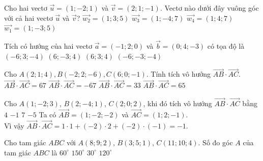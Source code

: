 \begin{ex}
	Cho hai vectơ $\vec{u}=(1;-2;1)$ và $\vec{v}=(2;1;-1)$. Vectơ nào dưới đây vuông góc với cả hai vectơ $\vec{u}$ và $\vec{v}$?
	\choice
	{\True $\vec{w_2}=(1;3;5)$}
	{$\vec{w_3}=(1;-4;7)$}
	{$\vec{w_4}=(1;4;7)$}
	{$\vec{w_1}=(1;-3;5)$}
\end{ex} 

\begin{ex}
	Tích có hướng của hai vectơ $\vec{a}=(-1;2;0)$ và $\vec{b}=(0;4;-3)$ có tọa độ là
	\choice
	{$(-6;3;-4)$}
	{$(6;-3;4)$}
	{$(6;3;4)$}
	{\True $(-6;-3;-4)$}
\end{ex} 

\begin{ex}
	Cho $ A(2;1;4), B(-2;2;-6), C(6;0;-1) $. Tính tích vô hướng $ \vec{AB}\cdot \vec{AC} $.
	\choice
	{$\vec{AB}\cdot \vec{AC}=67$}
	{$\vec{AB}\cdot \vec{AC}=-67$}
	{\True$\vec{AB}\cdot \vec{AC}=33$}
	{$\vec{AB}\cdot \vec{AC}=65$}
\end{ex} 

\begin{ex}
	Cho $ A(1;-2; 3)$, $ B(2;-4; 1)$, $ C(2; 0; 2)$, khi đó tích vô hướng $\vec{AB}\cdot\vec{AC}$ bằng
	\choice
	{$4$}
	{\True $-1$}
	{$7$}
	{$-5$}
	\loigiai
	{
		Ta có $\vec{AB}=(1;-2;-2)$ và $\vec{AC}=(1; 2;-1)$.\\
		Vì vậy $\vec{AB}\cdot\vec{AC}=1\cdot 1+(-2)\cdot 2+(-2)\cdot (-1)=-1 $.
	}
\end{ex} 

\begin{ex}%
	Cho tam giác $ABC$ với $A(8; 9; 2)$, $B(3; 5; 1)$, $C(11; 10; 4)$. Số đo góc $A$ của tam giác $ABC$ là
	\choice
	{$60^\circ$}
	{\True $150^\circ$}
	{$30^\circ$}
	{$120^\circ$}
\end{ex} 

